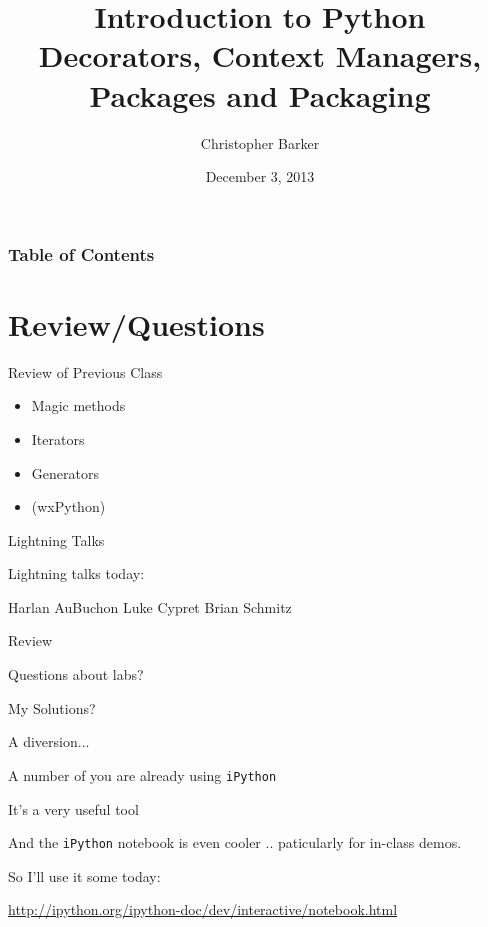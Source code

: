 \documentclass{beamer}
\title[Intro to Python: Week 9]{Introduction  to Python\\ 
Decorators, Context Managers, \\
Packages and Packaging}
\author{Christopher Barker}
\institute{UW Continuing Education}
\date{December 3, 2013}
\begin{document}
\begin{frame}
  \titlepage
\end{frame}

\begin{frame}
\frametitle{Table of Contents}
  \tableofcontents
\end{frame}


\section{Review/Questions}

\begin{frame}{Review of Previous Class}

\begin{itemize}
  \item Magic methods
  \item Iterators
  \item Generators
  \item (wxPython)
\end{itemize}

\end{frame}


\begin{frame}{Lightning Talks}

\vfill
{\LARGE Lightning talks today:}

\vfill
{\Large

\vfill
 Harlan AuBuchon
\vfill
  Luke Cypret
\vfill
 Brian Schmitz
\vfill

}
\vfill

\end{frame}


\begin{frame}{Review}

  \vfill
  {\Large Questions about labs? }

  \vfill
  {\Large My Solutions? }

  \vfill

\end{frame}

\begin{frame}[fragile]{A diversion...}

\Large{A number of you are already using \verb|iPython|}

\vfill
\Large{It's a very useful tool}

\vfill
\Large{And the \verb|iPython| notebook is even cooler .. paticularly for in-class demos.}

\vfill
\Large{So I'll use it some today:}

\vfill
\url{http://ipython.org/ipython-doc/dev/interactive/notebook.html}


\end{frame}
\end{document}
